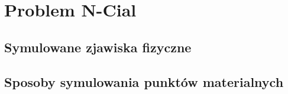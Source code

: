 
\section { Problem N-Cial }
\subsection {Symulowane zjawiska fizyczne}
\subsection {Sposoby symulowania punktów materialnych}
